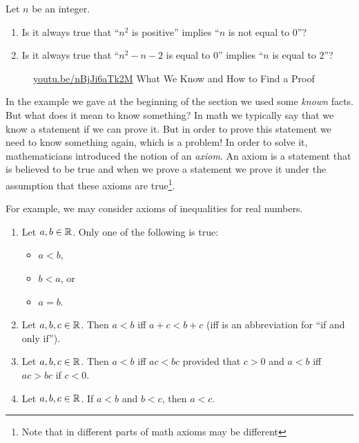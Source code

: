 \begin{exercise}
  Let $n$ be an integer.
  \begin{enumerate}
    \item Is it always true that ``$n^2$ is positive''
      implies ``$n$ is not equal to $0$''?
    \item Is it always true that ``$n^2 - n - 2$ is equal to $0$'' implies
      ``$n$ is equal to $2$''?
  \end{enumerate}
\end{exercise}

\begin{wrapfigure}{r}{4cm}
  \begin{center}
    \vskip -0.5cm
    \vskip 0.25cm
    \href{https://youtu.be/nBjJi6aTk2M}{youtu.be/nBjJi6aTk2M}
    {\footnotesize What We Know and How to Find a Proof}
  \end{center}
  \vskip -0.5cm
\end{wrapfigure}

In the example we gave at the beginning of the section we used some
\textit{known} facts. But what does it mean to know something? In math we
typically say that we know a statement if we can prove it. But in order to prove
this statement we need to know something again, which is a problem! In order to
solve it, mathematicians introduced the notion of an \textit{axiom}.
An axiom is a statement that is believed to be true and when we prove a statement
we prove it under the assumption that these axioms are true\footnote{Note that
in different parts of math axioms may be different}.

For example, we may consider axioms of inequalities for real numbers.
\begin{enumerate}
  \item Let $a, b \in \mathbb{R}$. Only one of the following is true:
    \begin{itemize}
      \item $a < b$,
      \item $b < a$, or
      \item $a = b$.
    \end{itemize}
  \item Let $a, b, c \in \mathbb{R}$. Then $a < b$ iff $a + c < b + c$ (iff is an
    abbreviation for ``if and only if'').
  \item Let $a, b, c \in \mathbb{R}$. Then $a < b$ iff $ac < bc$ provided
    that $c > 0$ and $a < b$ iff $ac > bc$ if $c < 0$.
  \item Let $a, b, c \in \mathbb{R}$. If $a < b$ and $b < c$, then $a < c$.
\end{enumerate}

